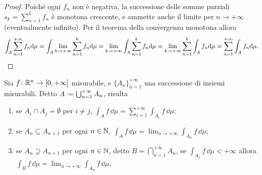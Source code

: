 \begin{proof}
	Poich\'e ogni $f_n$ non è negativa, la successione delle somme parziali $s_k=\sum_{n=1}^kf_n$ è monotona crescente, e ammette anche il limite per $n\to+\infty$ (eventualmente infinito).
	Per il teorema della convergenza monotona allora
	\begin{equation}
		\int_A\sum_{n=1}^{+\infty}f_n\textup{d}\mu=\int_A\lim_{k\to+\infty}\sum_{n=1}^kf_n\textup{d}\mu=\lim_{k\to+\infty}\int_A\sum_{n=1}^kf_n\textup{d}\mu=\lim_{k\to+\infty}\sum_{n=1}^k\int_Af_n\textup{d}\mu=\sum_{n=1}^{+\infty}\int_Af_n\textup{d}\mu.\qedhere
	\end{equation}
\end{proof}
\begin{corollario}
	Sia $f\colon\mathbb{R}^n\to[0,+\infty]$ misurabile, e $\{A_n\}_{n=1}^{+\infty}$ una successione di insiemi misurabili.
	Detto $A\defeq\bigcup_{n=1}^{+\infty}A_n$, risulta
	\begin{enumerate}
		\item se $A_i\cap A_j=\emptyset$ per $i\neq j$, $\int_Af\,\dd\mu=\sum_{i=1}^{+\infty}\int_{A_i}f\,\dd\mu$;
		\item se $A_n\subseteq A_{n+1}$ per ogni $n\in\mathbb{N}$, $\int_Af\,\dd\mu=\lim_{n\to+\infty}\int_{A_n}f\,\dd\mu$;
		\item se $A_n\supseteq A_{n+1}$ per ogni $n\in\mathbb{N}$, detto $B=\bigcap_{n=1}^{+\infty}A_n$, se $\int_{A_1}f\,\dd\mu<+\infty$ allora $\int_Bf\,\dd\mu=\lim_{n\to+\infty}\int_{A_n}f\,\dd\mu$.
	\end{enumerate}
\end{corollario}
